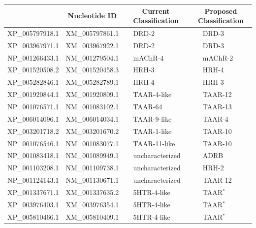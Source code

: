 \documentclass[fleqn,10pt]{wlpeerj}
\providecommand{\DIFdelend}{} %
\begin{document}
\DIFdelend \newpage

\begin{table}[htbp]
	\centering
	\begin{tabular}{l l l l l l}
		\hline\noalign{\smallskip}
		\multicolumn{1}{c}{Protein ID} & \multicolumn{1}{c}{Nucleotide ID} & \multicolumn{2}{c}{Current Classification} & \multicolumn{2}{c}{Proposed Classification} \\
		\hline\noalign{\smallskip}
		XP\_005797918.1 & XM\_005797861.1 & \qquad \qquad & DRD-2 & \qquad \qquad & DRD-3 \\
		XP\_003967971.1 & XM\_003967922.1 & \qquad \qquad & DRD-2 & \qquad \qquad & DRD-3 \\
		NP\_001266433.1 & NM\_001279504.1 & \qquad \qquad & mAChR-4 & \qquad \qquad & mAChR-2 \\
		XP\_001520508.2 & XM\_001520458.3 & \qquad \qquad & HRH-3 & \qquad \qquad & HRH-4 \\
		XP\_005282846.1 & XM\_005282789.1 & \qquad \qquad & HRH-4 & \qquad \qquad & HRH-3 \\
		XP\_001920844.1 & XM\_001920809.1 & \qquad \qquad & TAAR-4-like & \qquad \qquad & TAAR-12 \\
		NP\_001076571.1 & NM\_001083102.1 & \qquad \qquad & TAAR-64 & \qquad \qquad & TAAR-13 \\
		XP\_006014096.1 & XM\_006014034.1 & \qquad \qquad & TAAR-9-like & \qquad \qquad & TAAR-4 \\
		XP\_003201718.2 & XM\_003201670.2 & \qquad \qquad & TAAR-1-like & \qquad \qquad & TAAR-10 \\
		NP\_001076546.1 & NM\_001083077.1 & \qquad \qquad & TAAR-11-like & \qquad \qquad & TAAR-10 \\
		NP\_001083418.1 & NM\_001089949.1 & \qquad \qquad & uncharacterized & \qquad \qquad & ADRB \\
		NP\_001103208.1 & NM\_001109738.1 & \qquad \qquad & uncharacterized & \qquad \qquad & HRH-2 \\
		NP\_001124143.1 & NM\_001130671.1 & \qquad \qquad & uncharacterized & \qquad \qquad & TAAR-12 \\
		XP\_001337671.1 & XM\_001337635.2 & \qquad \qquad & 5HTR-4-like & \qquad \qquad & TAAR$^\ast$ \\
		XP\_003976403.1 & XM\_003976354.1 & \qquad \qquad & 5HTR-4-like & \qquad \qquad & TAAR$^\ast$ \\
		XP\_005810466.1 & XM\_005810409.1 & \qquad \qquad & 5HTR-4-like & \qquad \qquad & TAAR$^\ast$ \\

\end{tabular}
\end{table}
\end{document}
